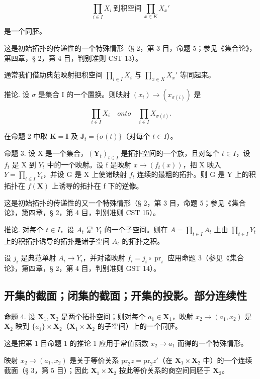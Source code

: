 \[\prod_{i \in I} X_i\ \text{到积空间}\ \prod_{x \in K} X_x'\]

是一个同胚。

这是初始拓扑的传递性的一个特殊情形（§ 2，第 3 目，命题 5；参见《集合论》，第四章，§ 2，第 4 目，判别准则 CST 13）。

通常我们借助典范映射把积空间 \(\prod_{i\in I}X_i\) 与 \(\prod_{x\in X}X_x'\) 等同起来。

推论. 设 \(\sigma\) 是集合 I 的一个置换。则映射 \((x_{i})\to (x_{\sigma(i)})\) 是

\[
\prod_ {i \in I} X _ {i} \quad onto \quad \prod_ {i \in I} X _ {\sigma (i)}.
\]

在命题 2 中取 \(\mathbf{K} = \mathbf{I}\) 及 \(\mathbf{J}_t = \{\sigma(t)\}\)（对每个 \(t \in I\)）。

命题 3. 设 X 是一个集合，\((\mathbf{Y}_{t})_{t\in I}\) 是拓扑空间的一个族，且对每个 \(t\in I\)，设 \(f_{t}\) 是 X 到 \(Y_{t}\) 中的一个映射。设 f 是映射 \(x\to(f_{t}(x))\)，把 X 映入 \(Y=\prod_{t\in I}Y_{t}\)，并设 G 是 X 上使诸映射 \(f_{t}\) 连续的最粗的拓扑。则 G 是 Y 上的积拓扑在 \(f(\mathbf{X})\) 上诱导的拓扑在 f 下的逆像。

这是初始拓扑的传递性的又一个特殊情形（§ 2，第 3 目，命题 5；参见《集合论》，第四章，§ 2，第 4 目，判别准则 CST 15）。

推论. 对每个 \(t \in I\)，设 \(A_{t}\) 是 \(Y_{t}\) 的一个子空间。则在 \(A = \prod_{t \in I} A_{t}\) 上由 \(\prod_{t \in I} Y_{t}\) 上的积拓扑诱导的拓扑是诸子空间 \(A_{t}\) 的拓扑之积。

设 \(j_{i}\) 是典范单射 \(A_{i} \to Y_{i}\)，并对诸映射 \(f_{i} = j_{i} \circ \operatorname{pr}_{i}\) 应用命题 3（参见《集合论》，第四章，§ 2，第 4 目，判别准则 GST 14）。

\subsection{开集的截面；闭集的截面；开集的投影。部分连续性}

命题 4. 设 \(\mathbf{X}_1, \mathbf{X}_2\) 是两个拓扑空间；则对每个 \(a_1 \in \mathbf{X}_1\)，映射 \(x_2 \to (a_1, x_2)\) 是 \(\mathbf{X}_2\) 映到 \(\{a_1\} \times \mathbf{X}_2\)（\(\mathbf{X}_1 \times \mathbf{X}_2\) 的子空间）上的一个同胚。

这是把第 1 目命题 1 的推论 1 应用于常值函数 \(x_{2} \rightarrow a_{1}\) 而得的一个特殊情形。

映射 \(x_{2} \to (a_{1}, x_{2})\) 是关于等价关系 \(\mathrm{pr}_{2}z = \mathrm{pr}_{2}z'\)（在 \(\mathbf{X}_{1} \times \mathbf{X}_{2}\) 中）的一个连续截面（§ 3，第 5 目）；因此 \(\mathbf{X}_{1} \times \mathbf{X}_{2}\) 按此等价关系的商空间同胚于 \(\mathbf{X}_{2}\)。

